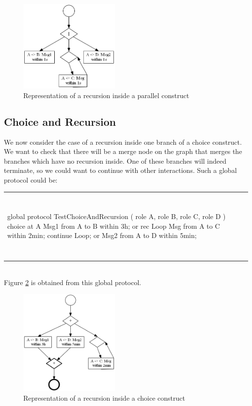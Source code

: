 \documentclass[a4paper,11pt,twoside]{report}
\begin{document}
\begin{figure}[h]
\begin{center}
\includegraphics[width=5cm]{TestParallelAndRecursion}\caption{Representation of a recursion inside a parallel construct}\label{fig:ParRecursion}
\end{center}
\end{figure}


\subsection{Choice and Recursion}
We now consider the case of a recursion inside one branch of a choice construct. We want to check that there will be a merge node on the graph that merges the branches which have no recursion inside. One of these branches will indeed terminate, so we could want to continue with other interactions. Such a global protocol could be:\\
\begin{tabular}{ll}
 ~&~ \\
\begin{SJLISTING}
global protocol TestChoiceAndRecursion ( role A, role B, role C, role D ) {
	choice at A { 
		Msg1 from A to B within 3h;
	} or {
 	rec Loop {
		Msg from A to C within 2min;
 		continue Loop;
		}
	}  or { 
		Msg2 from A to D within 5min;
	}
}
\end{SJLISTING}
& \\
~&~\\
\end{tabular}\\
Figure \ref{fig:ChoiceRecursion} is obtained from this global protocol.

\begin{figure}[h]
\begin{center}
\includegraphics[width=5cm]{TestChoiceAndRecursion}\caption{Representation of a recursion inside a choice construct}\label{fig:ChoiceRecursion}
\end{center}
\end{figure}
\end{document}
